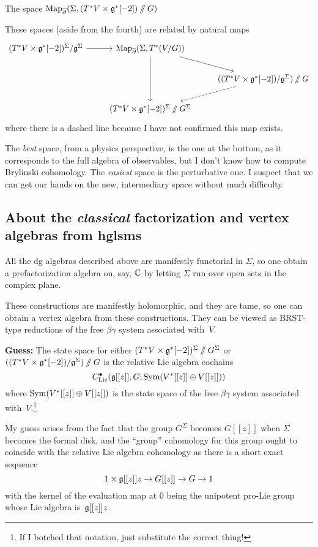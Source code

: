 \documentclass[11pt]{amsart}
\newcommand{\clie}{C^\bu_{\rm Lie}}
\begin{document}
The space ${\rm Map}_{\overline{\partial}}(\Sigma,(T^*V \times \mathfrak g^*[-2])\mathbin{/\mkern-6mu/} G)$ 

These spaces (aside from the fourth) are related by natural maps
\[
\begin{tikzcd}
(T^* V \times \fg^*[-2])^\Sigma/\fg^\Sigma \arrow[r] & \Map_{\dbar}(\Sigma, T^*(V/G)) \arrow[dd] \arrow[dr]& \\
&&  ((T^* V \times \fg^*[-2])/\fg^\Sigma)\sslash G \arrow[dl, dashed] \\
&(T^*V \times \fg^*[-2])^\Sigma \sslash G^\Sigma&
\end{tikzcd}
\]
where there is a dashed line because I have not confirmed this map exists.

The {\em best} space, from a physics perspective, is the one at the bottom,
as it corresponds to the full algebra of observables,
but I don't know how to compute Brylinski cohomology.
The {\em easiest} space is the perturbative one.
I suspect that we can get our hands on the new, intermediary space without much difficulty.

\subsection{About the {\it classical} factorization and vertex algebras from hglsms}

All the dg algebras described above are manifestly functorial in $\Sigma$, 
so one obtain a prefactorization algebra on, say, $\mathbb C$ by letting $\Sigma$ run over open sets in the complex plane.

These constructions are manifestly holomorphic, 
and they are tame,
so one can obtain a vertex algebra from these constructions.
They can be viewed as BRST-type reductions of the free $\beta\gamma$ system associated with~$V$.

{\bf Guess:} The state space for either $(T^*V \times \mathfrak g^*[-2])^\Sigma \mathbin{/\mkern-6mu/} G^\Sigma$ or $((T^* V \times \mathfrak g^*[-2])/\mathfrak g^\Sigma)\mathbin{/\mkern-6mu/} G$ is the relative Lie algebra cochains
\[
\clie(\fg[[z]], G; \Sym(V^*[[z]] \oplus V[[z]]))
\]
where $\operatorname{Sym}(V^*[[z]] \oplus V[[z]])$ is the state space of the free $\beta\gamma$ system associated with~$V$.\footnote{If I botched that notation, just substitute the correct thing!}

My guess arises from the fact that the group $G^\Sigma$ becomes $G[[z]]$ when $\Sigma$ becomes the formal disk,
and the ``group'' cohomology for this group ought to coincide with the relative Lie algebra cohomology as there is a short exact sequence
\[
1 \times \mathfrak g[[z]]z \to G[[z]] \to G \to 1
\]
with the kernel of the evaluation map at 0 being the unipotent pro-Lie group whose Lie algebra is~$\mathfrak g[[z]]z$.
\end{document}
